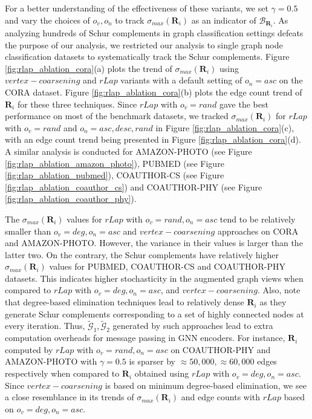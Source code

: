 \documentclass{article}
\def\mR{{\mathbf{R}}}
\def\gG{{\mathcal{G}}}
\theoremstyle{plain}
\theoremstyle{definition}
\theoremstyle{remark}
\begin{document}
For a better understanding of the effectiveness of these variants, we set $\gamma=0.5$ and vary the choices of $o_v, o_n$ to track $\sigma_{max}(\mR_i)$ as an indicator of $\mathcal{B}_{\mR_i}$. As analyzing hundreds of Schur complements in graph classification settings defeats the purpose of our analysis, we restricted our analysis to single graph node classification datasets to systematically track the Schur complements. Figure \ref{fig:rlap_ablation_cora}(a) plots the trend of $\sigma_{max}(\mR_i)$ using $vertex-coarsening$ and $rLap$ variants with a default setting of $o_n=asc$ on the CORA dataset. Figure \ref{fig:rlap_ablation_cora}(b) plots the edge count trend of $\mR_i$ for these three techniques. Since $rLap$ with $o_v=rand$ gave the best performance on most of the benchmark datasets, we tracked $\sigma_{max}(\mR_i)$ for $rLap$ with $o_v=rand$ and $o_n=asc, desc, rand$ in Figure \ref{fig:rlap_ablation_cora}(c), with an edge count trend being presented in Figure \ref{fig:rlap_ablation_cora}(d). A similar analysis is conducted for AMAZON-PHOTO (see Figure \ref{fig:rlap_ablation_amazon_photo}), PUBMED (see Figure \ref{fig:rlap_ablation_pubmed}), COAUTHOR-CS (see Figure \ref{fig:rlap_ablation_coauthor_cs}) and COAUTHOR-PHY (see Figure \ref{fig:rlap_ablation_coauthor_phy}).

The $\sigma_{max}(\mR_i)$ values for $rLap$ with $o_v=rand, o_n=asc$ tend to be relatively smaller than $o_v=deg, o_n=asc$ and $vertex-coarsening$ approaches on CORA and AMAZON-PHOTO. However, the variance in their values is larger than the latter two. On the contrary, the Schur complements have relatively higher $\sigma_{max}(\mR_i)$ values for PUBMED, COAUTHOR-CS and COAUTHOR-PHY datasets. This indicates higher stochasticity in the augmented graph views when compared to $rLap$ with $o_v=deg, o_n=asc$, and $vertex-coarsening$. Also, note that degree-based elimination techniques lead to relatively dense $\mR_i$ as they generate Schur complements corresponding to a set of highly connected nodes at every iteration. Thus, $\widetilde{\gG}_1, \widetilde{\gG}_2$ generated by such approaches lead to extra computation overheads for message passing in GNN encoders. For instance, $\mR_i$ computed by $rLap$ with $o_v=rand, o_n=asc$ on COAUTHOR-PHY and AMAZON-PHOTO with $\gamma=0.5$ is sparser by $\approx 50,000, \approx 60,000$ edges respectively when compared to $\mR_i$ obtained using $rLap$ with $o_v=deg, o_n=asc$. Since $vertex-coarsening$ is based on minimum degree-based elimination, we see a close resemblance in its trends of $\sigma_{max}(\mR_i)$ and edge counts with $rLap$ based on $o_v=deg, o_n=asc$.
\end{document}
